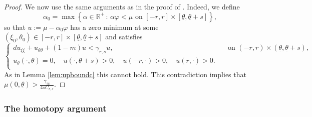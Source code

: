 \documentclass[11pt]{article}    %
\newcommand{\R}{\mathbb{R}}
\begin{document}
\begin{proof}
We now use the same arguments as in the proof of . Indeed, we define
\begin{equation*}
\alpha_0 = \max \left\lbrace \alpha \in \R^+ \, : \, \alpha \varphi < \mu \text{ on } [-r,r] \times [\underline\theta, \underline\theta + s]  \right\rbrace,
\end{equation*}
so that $u:= \mu - \alpha_0 \varphi$ has a zero minimum at some $(\xi_0,\theta_0) \in [-r,r] \times [\underline\theta, \underline\theta + s]$ and satisfies 
\begin{equation*}
\begin{cases}
d u_{\xi\xi} + u_{\theta\theta} + (1-m) u  < \gamma_{r,s} u,& \quad \text{on } (-r,r) \times (\underline\theta, \underline\theta + s),\\
u_\theta (\cdot,\underline\theta) = 0, \quad u(\cdot,\underline\theta + s) > 0, \quad u(-r,\cdot) > 0, \quad u(r,\cdot)  > 0. \\
\end{cases}
\end{equation*}
As in Lemma \ref{lem:upboundc} this cannot hold. This contradiction implies that $\mu(0,\underline\theta) > \frac{\gamma_\infty}{4 s C_{r,s}}$.

\end{proof}


\subsubsection{The homotopy argument}\label{sec:homotopy}
\end{document}
